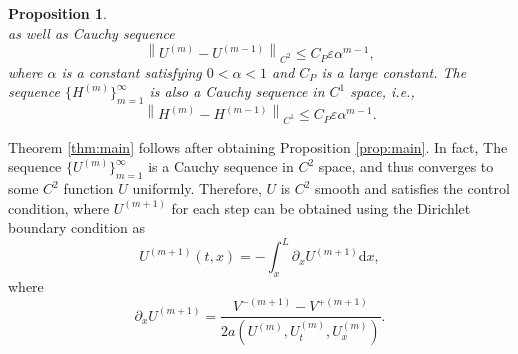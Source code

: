 \documentclass[a4paper,reqno,11pt]{amsart}
\numberwithin{equation}{section} %
\newtheorem{prop}[lem]{Proposition}
\begin{document}
\begin{prop}
\begin{equation}
\end{equation}
as well as Cauchy sequence 
\begin{equation}\label{cauchy u}
\left\lVert  U^{\left( m \right)}-U^{\left( m-1 \right)}\right\rVert  _{C^2}\leq C_P\varepsilon \alpha ^{m-1},
\end{equation}
where $\alpha$ is a constant satisfying $0<\alpha <1$ and $C_P$ is a large constant. The sequence $\{H^{(m)}\}_{m=1}^\infty$ is also a Cauchy sequence in $C^1$ space, i.e.,
\begin{equation}\label{cauchy h}
\left\lVert  H^{\left( m \right)}-H^{\left( m-1 \right)}\right\rVert  _{C^1}\leq C_P\varepsilon \alpha ^{m-1}.
\end{equation}
\end{prop}
Theorem \ref{thm:main} follows after obtaining Proposition \ref{prop:main}. In fact, The sequence $\{U ^{(m)}\} _{m=1} ^ \infty $ is a Cauchy sequence in $C^2$ space, and thus converges to some $C^2$ function $ U$ uniformly.%
Therefore, $U$ is $C^2$ smooth and satisfies the control condition, where $U^{(m+1)}$ for each step can be 
obtained using the Dirichlet boundary condition as
$$
U^{(m+1)}(t,x)=-\int_x^L \partial _x U^{(m+1)} \text{d} x,
$$
where
$$
\partial _x U^{(m+1)}=\frac{V^{-\left( m+1 \right) }-V^{+\left( m+1 \right)}}{ 2a\left({U}^{\left( m \right)} ,U_{t}^{\left( m \right)},U_{x}^{\left( m \right)} \right)}.
$$
\end{document}
